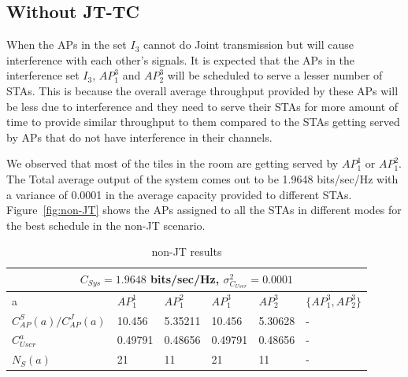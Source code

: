 \subsection{Without JT-TC}
When the APs in the set $I_3$ cannot do Joint transmission but will cause interference with each other's signals.
It is expected that the APs in the interference set $I_3$, \ie $AP_1^3$ and $AP_2^3$ will be scheduled to serve a lesser number of STAs. This is because the overall average throughput provided by these APs will be less due to interference and they need to serve their STAs for more amount of time to provide similar throughput to them compared to the STAs getting served by APs that do not have interference in their channels.

We observed that most of the tiles in the room are getting served by $ AP_1^1$ or $AP_1^2$.
The Total average output of the system comes out to be 1.9648 bits/sec/Hz with a variance of 0.0001 in the average capacity provided to different STAs.
Figure~\ref{fig:non-JT} shows the APs assigned to all the STAs in different modes for the best schedule in the non-JT scenario.



\begin{table}[h]
    \centering
    \renewcommand{\arraystretch}{1.35}
    \begin{tabular}{|p{2.5cm}||p{2cm}|p{2cm}|p{2cm}|p{2cm}|p{2cm}|}
        \hline
        \multicolumn{6}{|c|}{$C_{Sys} = 1.9648$ bits/sec/Hz,\hspace{0.5cm}    $\sigma^2_{C_{User}} = 0.0001$}
        \\
        \hline\hline
        a & $AP_1^1$ & $AP_1^2$ & $AP_1^3$ & $AP_2^3$ & $\{AP_1^3, AP_2^3\}$ \\
        \hline\hline
        $C_{AP}^S(a)/C_{AP}^J(a)$ & 10.456 & 5.35211 & 10.456 & 5.30628 & -
        \\
        \hline
        $C_{User}^a$ & 0.49791 & 0.48656 & 0.49791 & 0.48656 & -
        \\
        \hline
        $N_S(a)$ & 21 & 11 & 21 & 11 & -
        \\
        \hline
    \end{tabular}
    \caption{non-JT results}
    \label{tab:non-JT_results}
\end{table}

